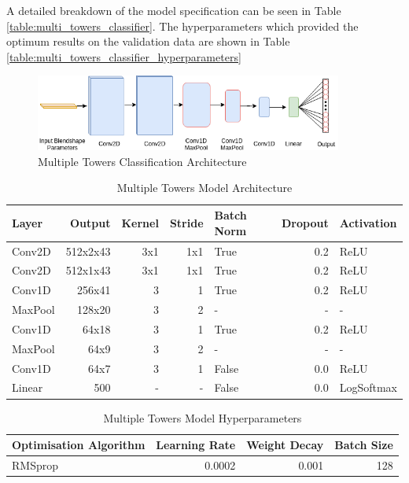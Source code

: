 A detailed breakdown of the model specification can be seen in Table \ref{table:multi_towers_classifier}.
The hyperparameters which provided the optimum results on the validation data are shown in Table \ref{table:multi_towers_classifier_hyperparameters} 

\begin{figure}[h!]
    \centering
        \includegraphics[width=0.9\textwidth]{figures/classification/blendshape_multi_tower_arch.png}
    \caption{Multiple Towers Classification Architecture}
\end{figure}\label{fig:Blendshape_Multiple_Towers}
\quad

\begin{table}[h!]
\centering
    \begin{tabular}{l | r | r | r | l | r | l}
    \textbf{Layer} & \textbf{Output} & \textbf{Kernel} & \textbf{Stride} & \textbf{Batch Norm} & \textbf{Dropout} & \textbf{Activation} \\ \hline
    Conv2D & 512x2x43 & 3x1 & 1x1 & True & 0.2 & ReLU \\ \hline
    Conv2D & 512x1x43 & 3x1 & 1x1 & True & 0.2 & ReLU \\ \hline
    Conv1D & 256x41 & 3 & 1 & True & 0.2 & ReLU \\ \hline
    MaxPool & 128x20 & 3 & 2 & - & - & - \\ \hline
    Conv1D & 64x18 & 3 & 1 & True & 0.2 & ReLU \\ \hline
    MaxPool & 64x9 & 3 & 2 & - & - & - \\ \hline
    Conv1D & 64x7 & 3 & 1 & False & 0.0 & ReLU \\ \hline
    Linear & 500 & - & - & False & 0.0 & LogSoftmax \\
    \end{tabular} 
    \caption{Multiple Towers Model Architecture}
\end{table}\label{table:multi_towers_classifier}
\quad

\begin{table}[h!]
\centering
    \begin{tabular}{l | r | r | r}
    \textbf{Optimisation Algorithm} & \textbf{Learning Rate} & \textbf{Weight Decay} & \textbf{Batch Size} \\ \hline
    RMSprop & 0.0002 & 0.001 & 128 \\
    \end{tabular} 
    \caption{Multiple Towers Model Hyperparameters}
\end{table}\label{table:multi_towers_classifier_hyperparameters}


